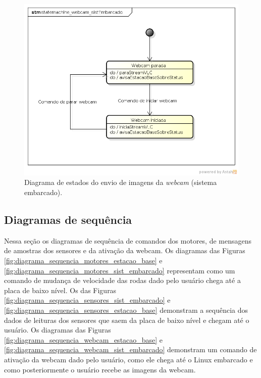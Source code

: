 \begin{figure}[H]
  \centering
  \includegraphics[width=\textwidth, keepaspectratio]{./figuras/sistEmbarcado/statemachine_webcam_sistEmbarcado.png}
  \caption{Diagrama de estados do envio de imagens da \textit{webcam} (sistema embarcado).}
  \label{fig:diagrama_estados_webcam_sist_embarcado}
\end{figure}



\subsection{Diagramas de sequência}

Nessa seção os diagramas de sequência de comandos dos motores, de mensagens de amostras dos sensores e da ativação da webcam. Os diagramas das Figuras \ref{fig:diagrama_sequencia_motores_estacao_base} e \ref{fig:diagrama_sequencia_motores_sist_embarcado} representam como um comando de mudança de velocidade das rodas dado pelo usuário chega até a placa de baixo nível. Os das Figuras \ref{fig:diagrama_sequencia_sensores_sist_embarcado} e \ref{fig:diagrama_sequencia_sensores_estacao_base} demonstram a sequência dos dados de leituras dos sensores que saem da placa de baixo nível e chegam até o usuário.  Os diagramas das Figuras \ref{fig:diagrama_sequencia_webcam_estacao_base} e \ref{fig:diagrama_sequencia_webcam_sist_embarcado} demonstram um comando de ativação da webcam dado pelo usuário, como ele chega até o Linux embarcado e como posteriormente o usuário recebe as imagens da webcam.

